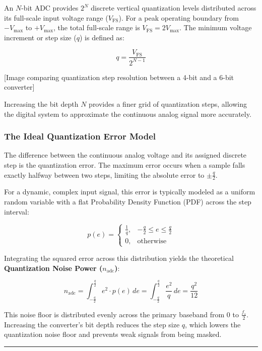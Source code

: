 \documentclass[
]{article}
\begin{document}
An \(N\)-bit ADC provides \(2^N\) discrete vertical quantization levels
distributed across its full-scale input voltage range
(\(V_{\text{FS}}\)). For a peak operating boundary from \(-V_{\max}\) to
\(+V_{\max}\), the total full-scale range is
\(V_{\text{FS}} = 2V_{\max}\). The minimum voltage increment or step
size (\(q\)) is defined as:

\[q = \frac{V_{\text{FS}}}{2^{N-1}}\]

{[}Image comparing quantization step resolution between a 4-bit and a
6-bit converter{]}

Increasing the bit depth \(N\) provides a finer grid of quantization
steps, allowing the digital system to approximate the continuous analog
signal more accurately.

\subsubsection{The Ideal Quantization Error
Model}\label{the-ideal-quantization-error-model}

The difference between the continuous analog voltage and its assigned
discrete step is the quantization error. The maximum error occurs when a
sample falls exactly halfway between two steps, limiting the absolute
error to \(\pm \frac{q}{2}\).

For a dynamic, complex input signal, this error is typically modeled as
a uniform random variable with a flat Probability Density Function (PDF)
across the step interval:

\[p(e) = \begin{cases} \frac{1}{q}, & -\frac{q}{2} \le e \le \frac{q}{2} \\ 0, & \text{otherwise} \end{cases}\]

Integrating the squared error across this distribution yields the
theoretical \textbf{Quantization Noise Power (\(n_{\text{adc}}\))}:

\[n_{\text{adc}} = \int_{-\frac{q}{2}}^{\frac{q}{2}} e^2 \cdot p(e) \, de = \int_{-\frac{q}{2}}^{\frac{q}{2}} \frac{e^2}{q} \, de = \frac{q^2}{12}\]

This noise floor is distributed evenly across the primary baseband from
\(0\) to \(\frac{f_s}{2}\). Increasing the converter's bit depth reduces
the step size \(q\), which lowers the quantization noise floor and
prevents weak signals from being masked.

\begin{center}\rule{0.5\linewidth}{0.5pt}\end{center}
\end{document}
